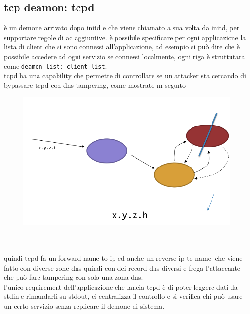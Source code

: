 \documentclass[12pt, oneside]{extbook} %
\begin{document}
\subsection{tcp deamon: tcpd}
è un demone arrivato dopo initd e che viene chiamato a sua volta da initd, per supportare regole di ac aggiuntive. è possibile specificare per ogni applicazione la lista di client che si sono connessi all'applicazione, ad esempio si può dire che è possibile accedere ad ogni servizio se connessi localmente, ogni riga è struttutara come \texttt{deamon\_list: client\_list}.\\tcpd ha una capability che permette di controllare se un attacker sta cercando di bypassare tcpd con dns tampering, come mostrato in seguito\\
\begin{figure}[!h]
	\includegraphics[scale=0.3]{immagini/tcpd_tampering.png}
\end{figure}\\\\
quindi tcpd fa un forward name to ip ed anche un reverse ip to name, che viene fatto con diverse zone dns quindi con dei record dns diversi e frega l'attaccante che può fare tampering con solo una zona dns.\\l'unico requirement dell'applicazione che lancia tcpd è di poter leggere dati da stdin e rimandarli su stdout, ci centralizza il controllo e si verifica chi può usare un certo servizio senza replicare il demone di sistema.
\end{document}
